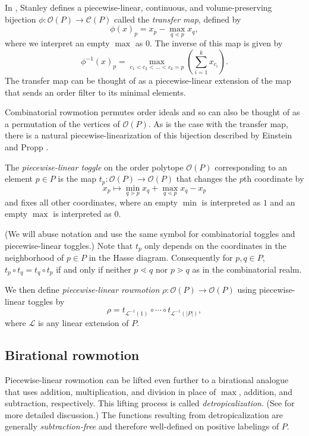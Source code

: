 \documentclass[11pt]{article}
\theoremstyle{definition}
\numberwithin{equation}{section}
\numberwithin{equation}{section}
\newcommand{\op}{\mathcal{O}(P)}
\newcommand{\cp}{\mathcal{C}(P)}
\begin{document}
In \cite{stanley2}, Stanley defines a piecewise-linear, continuous, and volume-preserving bijection $\phi \colon \op \to \cp$ called the \emph{transfer map}, defined by
\[\phi(x)_p = x_p - \max\limits_{q \lessdot p} x_q,\]
where we interpret an empty $\max$ as $0$.
The inverse of this map is given by
\[\phi^{-1}(x)_p = \max\limits_{c_1 < c_2 < \dots < c_k = p} \left( \sum\limits_{i=1}^k x_{c_i} \right).\]
The transfer map can be thought of as a piecewise-linear extension of the map that sends an order filter to its minimal elements.

Combinatorial rowmotion permutes order ideals and so can also be thought of as a permutation of the vertices of $\op$. As is the case with the transfer map, there is a natural piecewise-linearization of this bijection described by Einstein and Propp \cite{einsteinpropp1}.

\begin{Def}
The \textit{piecewise-linear toggle} on the order polytope $\op$ corresponding to an element $p \in P$ is the map $t_p\colon \op \to \op$ that changes the $p$th coordinate by
\[x_p \mapsto \min\limits_{q \gtrdot p} x_q + \max\limits_{q \lessdot p} x_q - x_p\]
and fixes all other coordinates, where an empty $\min$ is interpreted as $1$ and an empty $\max$ is interpreted as $0$.
\end{Def}
(We will abuse notation and use the same symbol for combinatorial toggles and piecewise-linear toggles.)
Note that $t_p$ only depends on the coordinates in the neighborhood of $p \in P$ in the Hasse diagram. Consequently for $p,q \in P$, $t_p \circ t_q = t_q \circ t_p$ if and only if neither $p \lessdot q$ nor $p \gtrdot q$ as in the combinatorial realm.

We then define \textit{piecewise-linear rowmotion} $\rho\colon \op \to \op$ using piecewise-linear toggles by
\[\rho = t_{\mathcal{L}^{-1}(1)} \circ \cdots \circ t_{\mathcal{L}^{-1}(|P|)},\]
where $\mathcal{L}$ is any linear extension of $P$.

\subsection{Birational rowmotion}

Piecewise-linear rowmotion can be lifted even further to a birational analogue that uses addition, multiplication, and division in place of $\max$, addition, and subtraction, respectively. This lifting process is called \emph{detropicalization}. (See \cite{einsteinpropp2,einsteinpropp1,noumiyamada} for more detailed discussion.) The functions resulting from detropicalization are generally \emph{subtraction-free} and therefore well-defined on positive labelings of $P$.
\end{document}
